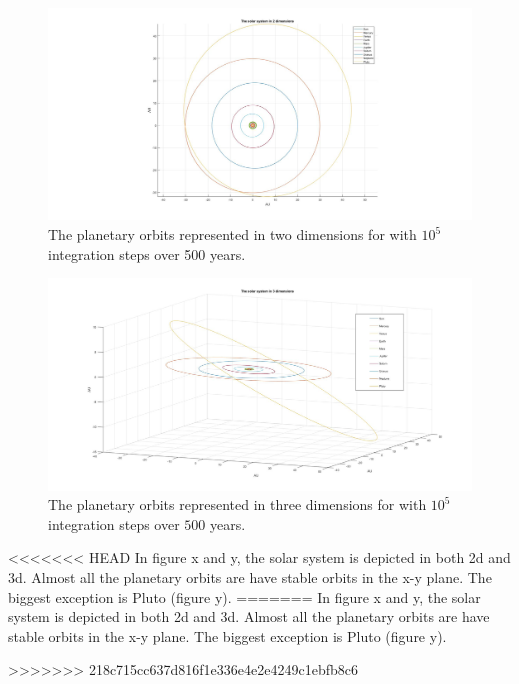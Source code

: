 \documentclass[10pt,a4paper]{article}
\begin{document}
\begin{figure} [H]  
\centerline{\includegraphics[scale=0.40]{2dsolsys.jpg}}
\caption{The planetary orbits represented in two dimensions for with $10^5$ integration steps over 500 years.}
\end{figure}



\begin{figure} [H]

\centerline{\includegraphics[scale=0.35]{3dsolsys.jpg}}
\caption{The planetary orbits represented in three dimensions for with $10^5$ integration steps over $500$ years.}

\end{figure}

<<<<<<< HEAD
In figure x and y, the solar system is depicted in both 2d and 3d. Almost all the planetary orbits are have stable orbits in the x-y plane. The biggest exception is Pluto (figure y). 
=======
In figure x and y, the solar system is depicted in both 2d and 3d. Almost all the planetary orbits are have stable orbits in the x-y plane. The biggest exception is Pluto (figure y).

>>>>>>> 218c715cc637d816f1e336e4e2e4249c1ebfb8c6
\end{document}
